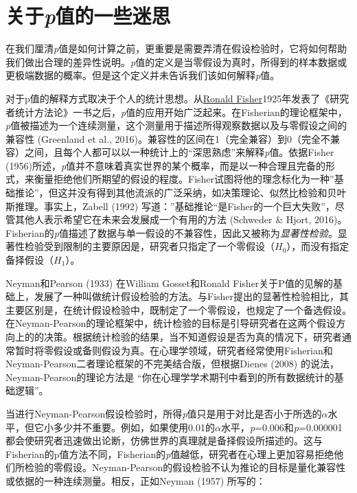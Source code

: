 \documentclass[
  letterpaper,
  DIV=11,
  numbers=noendperiod]{scrreprt}
\begin{document}
\hypertarget{ux5173ux4e8epux503cux7684ux4e00ux4e9bux8ff7ux601d}{%
\section{\texorpdfstring{关于\emph{p}值的一些迷思}{关于p值的一些迷思}}\label{ux5173ux4e8epux503cux7684ux4e00ux4e9bux8ff7ux601d}}

在我们厘清\emph{p}值是如何计算之前，更重要是需要弄清在假设检验时，它将如何帮助我们做出合理的差异性说明。\emph{p}值的定义是当零假设为真时，所得到的样本数据或更极端数据的概率。但是这个定义并未告诉我们该如何解释\emph{p}值。

对于p值的解释方式取决于个人的统计思想。从\href{https://en.wikipedia.org/wiki/Ronald_Fisher}{Ronald
Fisher}1925年发表了《研究者统计方法论》一书之后，\emph{p}值的应用开始广泛起来。在Fisherian的理论框架中，\emph{p}值被描述为一个连续测量，这个测量用于描述所得观察数据以及与零假设之间的兼容性
(Greenland et al.,
2016)。兼容性的区间在1（完全兼容）到0（完全不兼容）之间，且每个人都可以以一种统计上的``深思熟虑''来解释\emph{p}值。依据Fisher
(1956)所述，\emph{p}值并不意味着真实世界的某个概率，而是以一种合理且完备的形式，来衡量拒绝他们所期望的假设的程度。Fisher试图将他的理念标化为一种''基础推论''，但这并没有得到其他流派的广泛采纳，如决策理论、似然比检验和贝叶斯推理。事实上，Zabell
(1992)
写道：''基础推论``是Fisher的一个巨大失败''，尽管其他人表示希望它在未来会发展成一个有用的方法
(Schweder \& Hjort,
2016)。Fisherian的\emph{p}值描述了数据与单一假设的不兼容性，因此又被称为\emph{显著性检验}。显著性检验受到限制的主要原因是，研究者只指定了一个零假设（\(H_0\)），而没有指定备择假设（\(H_1\)）。

Neyman和Pearson (1933) 在William Gosset和Ronald
Fisher关于P值的见解的基础上，发展了一种叫做统计假设检验的方法。与Fisher提出的显著性检验相比，其主要区别是，在统计假设检验中，既制定了一个零假设，也规定了一个备选假设。在Neyman-Pearson的理论框架中，统计检验的目标是引导研究者在这两个假设方向上的的决策。根据统计检验的结果，当不知道假设是否为真的情况下，研究者通常暂时将零假设或备则假设为真。在心理学领域，研究者经常使用Fisherian和Neyman-Pearson二者理论框架的不完美结合版，但根据Dienes
(2008) 的说法，Neyman-Pearson的理论方法是
``你在心理学学术期刊中看到的所有数据统计的基础逻辑''。

当进行Neyman-Pearson假设检验时，所得\emph{p}值只是用于对比是否小于所选的\(\alpha\)水平，但它小多少并不重要。例如，如果使用0.01的\(\alpha\)水平，\emph{p}=0.006和\emph{p}=0.000001都会使研究者迅速做出论断，仿佛世界的真理就是备择假设所描述的。这与Fisherian的p值方法不同，Fisherian的\emph{p}值越低，研究者在心理上更加容易拒绝他们所检验的零假设。Neyman-Pearson的假设检验不认为推论的目标是量化兼容性或依据的一种连续测量。相反，正如Neyman
(1957) 所写的：
\end{document}

